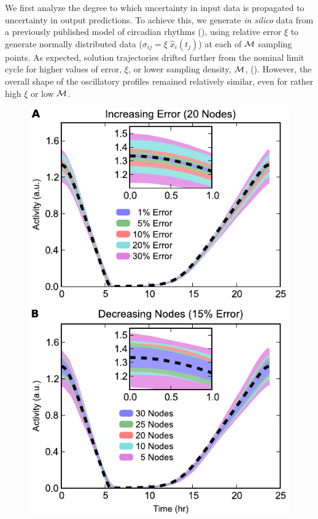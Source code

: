 {We first analyze the degree to which uncertainty in input data is propagated to uncertainty in output predictions. 
To achieve this, we generate {\itshape in silico} data from a previously published model of circadian rhythms (), using relative error $\xi$ to generate normally distributed data ($\sigma_{ij} = \xi \; \hat{x}_{i}(t_j)$) at each of $\cal M$ sampling points. 
As expected, solution trajectories drifted further from the nominal limit cycle for higher values of error, $\xi$, or lower sampling density, $\cal M$, (). 
However, the overall shape of the oscillatory profiles remained relatively similar, even for rather high $\xi$ or low $\cal M$.

\begin{figure}[p]
  \centering
  \includegraphics{chap3/figures/fig2.pdf}

\end{figure}}
